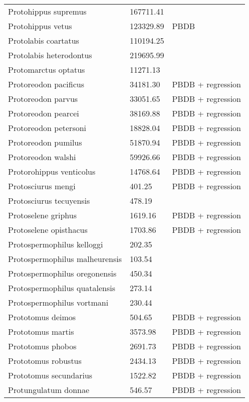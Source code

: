 \documentclass{article}
\begin{document}
\begin{center}
\begin{longtable}{p{} p{} p{} }
  Protohippus supremus & 167711.41 & \cite{Tomiya2013} \\ 
  Protohippus vetus & 123329.89 & PBDB \\ 
  Protolabis coartatus & 110194.25 & \cite{Tomiya2013} \\ 
  Protolabis heterodontus & 219695.99 & \cite{Tomiya2013} \\ 
  Protomarctus optatus & 11271.13 & \cite{Tomiya2013} \\ 
  Protoreodon pacificus & 34181.30 & PBDB + regression \\ 
  Protoreodon parvus & 33051.65 & PBDB + regression \\ 
  Protoreodon pearcei & 38169.88 & PBDB + regression \\ 
  Protoreodon petersoni & 18828.04 & PBDB + regression \\ 
  Protoreodon pumilus & 51870.94 & PBDB + regression \\ 
  Protoreodon walshi & 59926.66 & PBDB + regression \\ 
  Protorohippus venticolus & 14768.64 & PBDB + regression \\ 
  Protosciurus mengi & 401.25 & PBDB + regression \\ 
  Protosciurus tecuyensis & 478.19 & \cite{Tomiya2013} \\ 
  Protoselene griphus & 1619.16 & PBDB + regression \\ 
  Protoselene opisthacus & 1703.86 & PBDB + regression \\ 
  Protospermophilus kelloggi & 202.35 & \cite{Tomiya2013} \\ 
  Protospermophilus malheurensis & 103.54 & \cite{Tomiya2013} \\ 
  Protospermophilus oregonensis & 450.34 & \cite{Tomiya2013} \\ 
  Protospermophilus quatalensis & 273.14 & \cite{Tomiya2013} \\ 
  Protospermophilus vortmani & 230.44 & \cite{Tomiya2013} \\ 
  Prototomus deimos & 504.65 & PBDB + regression \\ 
  Prototomus martis & 3573.98 & PBDB + regression \\ 
  Prototomus phobos & 2691.73 & PBDB + regression \\ 
  Prototomus robustus & 2434.13 & PBDB + regression \\ 
  Prototomus secundarius & 1522.82 & PBDB + regression \\ 
  Protungulatum donnae & 546.57 & PBDB + regression \\ 

\end{longtable}
\end{center}
\end{document}
